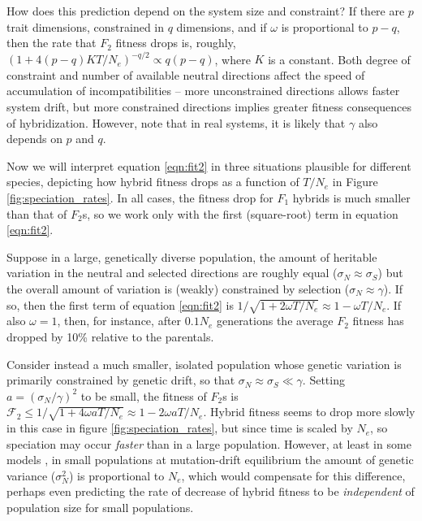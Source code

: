 \documentclass{article}
\newcommand{\1}{\mathbbm{1}}
\newcommand{\fit}{\mathcal{F}}
\begin{document}
How does this prediction depend on the system size and constraint?
If there are $p$ trait dimensions, constrained in $q$ dimensions,
and if $\omega$ is proportional to $p-q$,
then the rate that $F_2$ fitness drops is, roughly,
$(1 + 4 (p-q) K T/N_e)^{-q/2} \propto q (p-q)$, where $K$ is a constant.
Both degree of constraint and number of available neutral directions
affect the speed of accumulation of incompatibilities --
more unconstrained directions allows faster system drift,
but more constrained directions implies greater fitness consequences of hybridization.
However, note that in real systems, it is likely that $\gamma$ also depends on $p$ and $q$.

Now we will interpret equation \eqref{eqn:fit2} in three situations plausible for different species,
depicting how hybrid fitness drops as a function of $T/N_e$ in Figure \ref{fig:speciation_rates}.
In all cases, the fitness drop for $F_1$ hybrids is much smaller than that of $F_2$s,
so we work only with the first (square-root) term in equation \eqref{eqn:fit2}.

Suppose in a large, genetically diverse population,
the amount of heritable variation in the neutral and selected directions are roughly equal 
($\sigma_N \approx \sigma_S$)
but the overall amount of variation is (weakly) constrained by selection
($\sigma_N \approx \gamma$).
If so, then the first term of equation \eqref{eqn:fit2} is
$1/\sqrt{1 + 2 \omega T/N_e} \approx 1 - \omega T/N_e$.
If also $\omega=1$, then, for instance, after $0.1 N_e$ generations
the average $F_2$ fitness has dropped by 10\% relative to the parentals.

Consider instead a much smaller, isolated population
whose genetic variation is primarily constrained by genetic drift,
so that $\sigma_N \approx \sigma_S \ll \gamma$.
Setting $a = (\sigma_N/\gamma)^2$ to be small,
the fitness of $F_2$s is $\fit_2 \le 1/\sqrt{1 + 4 \omega a T/N_e} \approx 1 - 2 \omega a T/N_e$.
Hybrid fitness seems to drop more slowly in this case in figure \ref{fig:speciation_rates},
but since time is scaled by $N_e$, so speciation may occur \emph{faster} than in a large population.
However, at least in some models \citep{lynch1986phenotypic}, in small populations at mutation-drift equilibrium
the amount of genetic variance ($\sigma_N^2$) is proportional to $N_e$,
which would compensate for this difference, 
perhaps even predicting the rate of decrease of hybrid fitness to be \emph{independent} of population size
for small populations.
\end{document}
